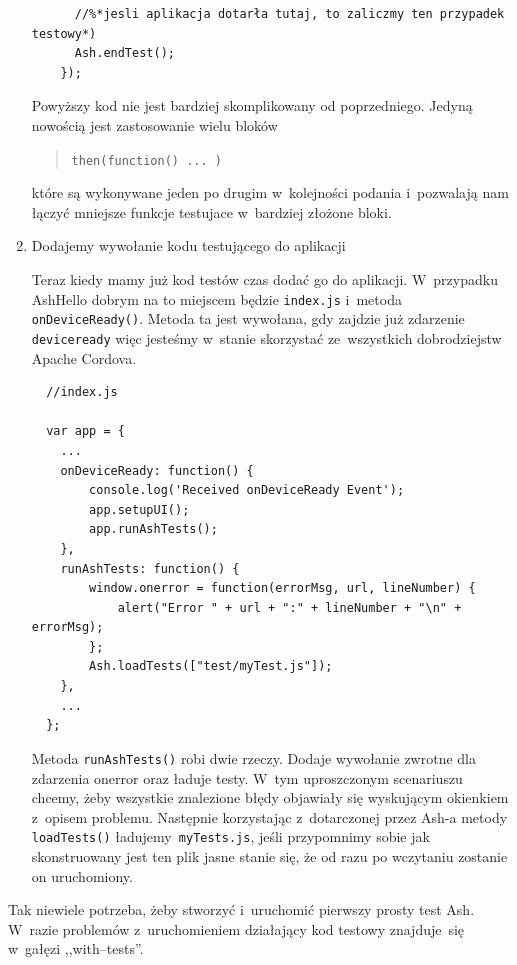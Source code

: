 \documentclass[brudnopis]{xmgr}
\begin{document}
\begin{enumerate}
\begin{lstlisting}
      //%*jesli aplikacja dotarła tutaj, to zaliczmy ten przypadek testowy*)
      Ash.endTest();
    });
\end{lstlisting}

Powyższy kod nie jest bardziej skomplikowany od poprzedniego. Jedyną nowością jest zastosowanie wielu bloków 

\begin{quote}
  \texttt{then(function(){ ... })}
\end{quote}

które są wykonywane jeden po drugim w~kolejności podania i~pozwalają nam łączyć mniejsze funkcje testujace w~bardziej złożone bloki.

 \item Dodajemy wywołanie kodu testującego do aplikacji

Teraz kiedy mamy już kod testów czas dodać go do aplikacji. W~przypadku AshHello dobrym na to miejscem będzie \texttt{index.js} i~metoda \mbox{\texttt{onDeviceReady()}}. Metoda ta jest wywołana, gdy zajdzie już zdarzenie \texttt{deviceready} więc jesteśmy w~stanie skorzystać ze~wszystkich dobrodziejstw Apache Cordova.

 \begin{lstlisting}
  //index.js
  
  var app = {
	...
    onDeviceReady: function() {
        console.log('Received onDeviceReady Event');
        app.setupUI();
        app.runAshTests();
    },
    runAshTests: function() {
        window.onerror = function(errorMsg, url, lineNumber) {
            alert("Error " + url + ":" + lineNumber + "\n" + errorMsg);
        };
        Ash.loadTests(["test/myTest.js"]);
    },
	...
  };

\end{lstlisting}

Metoda \texttt{runAshTests()} robi dwie rzeczy. Dodaje wywołanie zwrotne dla zdarzenia onerror oraz ładuje testy. W~tym uproszczonym scenariuszu chcemy, żeby wszystkie znalezione błędy objawiały się wyskującym okienkiem z~opisem problemu. Następnie korzystając z~dotarczonej przez Ash-a metody \texttt{loadTests()} ładujemy\texttt{ myTests.js}, jeśli przypomnimy sobie jak skonstruowany jest ten plik jasne stanie się, że od razu po wczytaniu zostanie on uruchomiony. 

\end{enumerate}

Tak niewiele potrzeba, żeby stworzyć i~uruchomić pierwszy prosty test Ash. W~razie problemów z~uruchomieniem działający kod testowy znajduje~się w~gałęzi ,,with--tests''.
\end{document}
